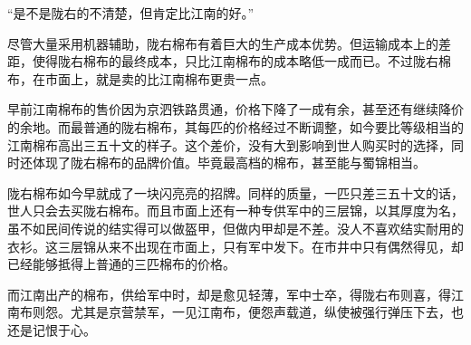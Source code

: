 “是不是陇右的不清楚，但肯定比江南的好。”

尽管大量采用机器辅助，陇右棉布有着巨大的生产成本优势。但运输成本上的差距，使得陇右棉布的最终成本，只比江南棉布的成本略低一成而已。不过陇右棉布，在市面上，就是卖的比江南棉布更贵一点。

早前江南棉布的售价因为京泗铁路贯通，价格下降了一成有余，甚至还有继续降价的余地。而最普通的陇右棉布，其每匹的价格经过不断调整，如今要比等级相当的江南棉布高出三五十文的样子。这个差价，没有大到影响到世人购买时的选择，同时还体现了陇右棉布的品牌价值。毕竟最高档的棉布，甚至能与蜀锦相当。

陇右棉布如今早就成了一块闪亮亮的招牌。同样的质量，一匹只差三五十文的话，世人只会去买陇右棉布。而且市面上还有一种专供军中的三层锦，以其厚度为名，虽不如民间传说的结实得可以做盔甲，但做内甲却是不差。没人不喜欢结实耐用的衣衫。这三层锦从来不出现在市面上，只有军中发下。在市井中只有偶然得见，却已经能够抵得上普通的三匹棉布的价格。

而江南出产的棉布，供给军中时，却是愈见轻薄，军中士卒，得陇右布则喜，得江南布则怨。尤其是京营禁军，一见江南布，便怨声载道，纵使被强行弹压下去，也还是记恨于心。
